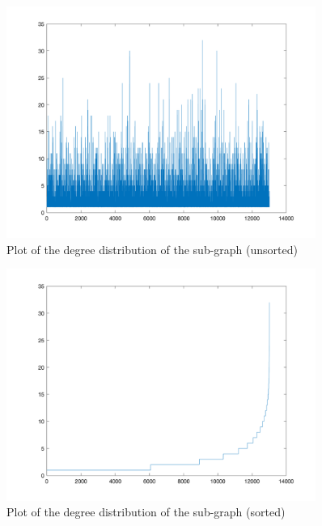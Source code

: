 \documentclass{article}
\begin{document}
    \begin{figure}[H]
            \centering
            \includegraphics[width=0.9\textwidth]{2.0.png}
            \caption{Plot of the degree distribution of the sub-graph (unsorted)}
            \label{fig:figure-2.0}
    \end{figure}
    \begin{figure}[H]
            \centering
            \includegraphics[width=0.9\textwidth]{2.1.png}
            \caption{Plot of the degree distribution of the sub-graph (sorted)}
            \label{fig:figure-2.1}
    \end{figure}
    
\end{document}
